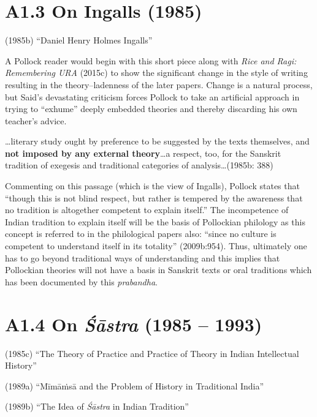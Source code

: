 \section*{A1.3 On Ingalls (1985)}

(1985b) “Daniel Henry Holmes Ingalls”

A Pollock reader would begin with this short piece along with \textit{Rice and Ragi: Remembering URA} (2015c) to show the significant change in the style of writing resulting in the theory–ladenness of the later papers. Change is a natural process, but Said’s devastating criticism forces Pollock to take an artificial approach in trying to “exhume” deeply embedded theories and thereby discarding his own teacher’s advice.

\begin{myquote}
…literary study ought by preference to be suggested by the texts themselves, and \textbf{not imposed by any external theory}…a respect, too, for the Sanskrit tradition of exegesis and traditional categories of analysis…(1985b: 388)
\end{myquote}

Commenting on this passage (which is the view of Ingalls), Pollock states that “though this is not blind respect, but rather is tempered by the awareness that no tradition is altogether competent to explain itself.” The incompetence of Indian tradition to explain itself will be the basis of Pollockian philology as this concept is referred to in the philological papers also: “since no culture is competent to understand itself in its totality” (2009b:954). Thus, ultimately one has to go beyond traditional ways of understanding and this implies that Pollockian theories will not have a basis in Sanskrit texts or oral traditions which has been documented by this \textit{prabandha}.


\section*{A1.4 On \textit{Śāstra} (1985 – 1993)}

\item (1985c) “The Theory of Practice and Practice of Theory in Indian Intellectual History”

 \item (1989a) “Mīmāṁsā and the Problem of History in Traditional India”

 \item (1989b) “The Idea of \textit{Śāstra} in Indian Tradition”

